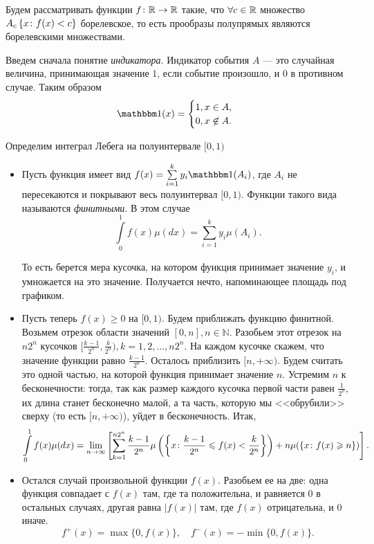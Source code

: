 \documentclass[../TV&MS.tex]{subfiles}
\begin{document}
Будем рассматривать функции $f \colon \mathbb{R} \to \mathbb{R}$ такие, что $\forall c\in\mathbb{R}$ 
множество $A_c\left\{ x \colon f(x) < c \right\}$ борелевское, то есть прообразы полупрямых являются
борелевскими множествами.
  
Введем сначала понятие \emph{индикатора}. Индикатор события $A$ --- это случайная 
величина, принимающая значение $1$, если событие произошло, и $0$ в противном случае.
Таким образом
\[
  	\Ind(x) = 
  	\begin{cases}
  		1, x \in A, \\
  		0, x \not\in A.
  	\end{cases}
\]
  
Определим интеграл Лебега на полуинтервале $[0, 1)$
\begin{itemize}
 	\item Пусть функция имеет вид $f(x) = \sum\limits_{i=1}^ky_i \Ind(A_i)$,
 	где $A_i$ не пересекаются и покрывают весь полуинтервал $[0,1)$. 
 	Функции такого вида называются \emph{финитными}. В этом случае
 	$$
 		\int\limits_0^1f(x)\mu(dx) = \sum\limits_{i=1}^k y_i \mu(A_i). 
 	$$
	
	То есть берется мера кусочка, на котором функция принимает значение $y_i$, 
	и умножается на это значение. Получается нечто, напоминающее площадь под графиком.

	\item Пусть теперь $f(x) \ge 0$ на $[0, 1)$. Будем приближать функцию финитной. 
	Возьмем отрезок области значений $[0, n], n \in \mathbb{N}$. Разобьем этот отрезок 
	на $n2^n$ кусочков $[\frac{k-1}{2^n}, \frac{k}{2^n}), k = 1, 2, \dots, n2^n$. 
	На каждом кусочке скажем, что значение функции равно $\frac{k-1}{2^n}$. 
	Осталось приблизить $[n, +\infty)$. Будем считать это одной частью, на которой 
	функция принимает значение $n$. Устремим $n$ к бесконечности: тогда, так 
	как размер каждого кусочка первой части равен $\frac{1}{2^n}$, их длина станет 
	бесконечно малой, а та часть, которую мы <<обрубили>> сверху (то есть $[n, +\infty)$), 
	уйдет в бесконечность. Итак,
	$$ 
		\int\limits_0^1 f(x) \mu(dx) = \lim_{n \to \infty}  
		\left[\sum\limits_{k=1}^{n2^n} \frac{k-1}{2^n} 
		\mu\left(\left\{ x \colon \frac{k-1}{2^n} \leqslant f(x) < \frac{k}{2^n} \right\}\right) 
		+ n \mu(\left\{ x \colon f(x) \geqslant n \right\})\right].
	$$
	
	\item Остался случай произвольной функции $f(x)$. Разобьем ее на две: одна 
	функция совпадает с $f(x)$ там, где та положительна, и равняется $0$ в остальных 
	случаях, другая равна $|f(x)|$ там, где $f(x)$ отрицательна, и $0$ иначе. 
	$$ 
		f^+(x) = \max\{0, f(x)\},\quad f^-(x) = -\min\{0, f(x)\}.
	$$


\end{itemize}
\end{document}
